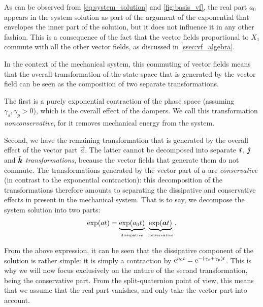As can be observed from \cref{eq:system_solution} and \cref{fig:basis_vf}, the real part \(a_0\) appears in the system solution as part of the argument of the exponential that envelopes the inner part of the solution, but it does not influence it in any other fashion. This is a consequence of the fact that the vector fields proportional to \(X_1\) commute with all the other vector fields, as discussed in \cref{ssec:vf_algebra}. 

In the context of the mechanical system, this commuting of vector fields means that the overall transformation of the state-space that is generated by the vector field can be seen as the composition of two separate transformations. 

The first is a purely exponential contraction of the phase space (assuming \(\gamma_s, \gamma_p > 0\)), which is the overall effect of the dampers. We call this transformation \emph{nonconservative}, for it removes mechanical energy from the system. 

Second, we have the remaining transformation that is generated by the overall effect of the vector part \(\vec{a}\). The latter cannot be decomposed into separate \(\quati\), \(\quatj\) and \(\quatk\) \emph{transformations}, because the vector fields that generate them do not commute. The transformations generated by the vector part of \(a\) are \emph{conservative} (in contrast to the exponential contraction): this decomposition of the transformations therefore amounts to separating the dissipative and conservative effects in present in the mechanical system. That is to say, we decompose the system solution into two parts:
\begin{equation}
     \exp(a t) = \underbrace{\exp(a_0 t)}_{\text{\tiny dissipative}} \: \underbrace{\exp(\vec{a} t)}_{\text{\tiny conservative}}.
\end{equation}

From the above expression, it can be seen that the dissipative component of the solution is rather simple: it is simply a contraction by \(\ec^{a_0t } = \ec^{-(\gamma_s + \gamma_p)t}\). This is why we will now focus exclusively on the nature of the second transformation, being the conservative part. From the split-quaternion point of view, this means that we assume that the real part vanishes, and only take the vector part into account.

